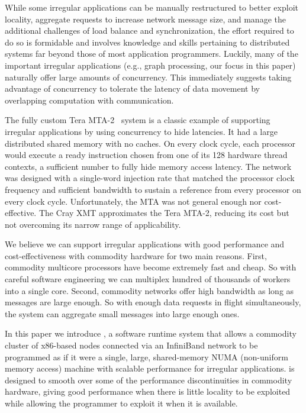While some irregular applications can be manually restructured to better
exploit locality, aggregate requests to increase network message size, and
manage the additional challenges of load balance and synchronization, the
effort required to do so is formidable and involves knowledge and skills
pertaining to distributed systems far beyond those of most application
programmers. Luckily, many of the important irregular applications (e.g.,
graph processing, our focus in this paper) naturally offer large amounts of
concurrency. This immediately suggests taking advantage of concurrency to
tolerate the latency of data movement by overlapping computation with
communication.

The fully custom Tera MTA-2~\cite{tera:mta1} system is a classic example of
supporting irregular applications by using concurrency to hide latencies. It
had a large distributed shared memory with no caches. On every clock cycle,
each processor would execute a ready instruction chosen from one of its 128
hardware thread contexts, a sufficient number to fully hide memory access
latency. The network was designed with a single-word injection rate that
matched the processor clock frequency and sufficient bandwidth to sustain a
reference from every processor on every clock cycle. Unfortunately, the MTA
was not general enough nor cost-effective. The Cray XMT approximates the Tera
MTA-2, reducing its cost but not overcoming its narrow range of applicability.

We believe we can support irregular applications with good performance and
cost-effectiveness with commodity hardware for two main reasons. First,
commodity multicore processors have become extremely fast and cheap. So with
careful software engineering we can multiplex hundred of thousands of
workers into a single core. Second, commodity networks offer high
bandwidth as long as messages are large enough. So with enough data requests
in flight simultaneously, the system can aggregate small messages into large
enough ones.

In this paper we introduce \Grappa, a software runtime system that allows a
commodity cluster of x86-based nodes connected via an InfiniBand network to be
programmed as if it were a single, large, shared-memory NUMA (non-uniform
memory access) machine with scalable performance for irregular applications.
\Grappa is designed to smooth over some of the performance discontinuities in
commodity hardware, giving good performance when there is little locality to
be exploited while allowing the programmer to exploit it when it is available.

